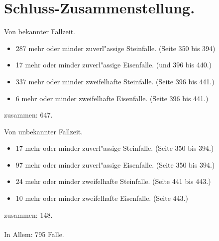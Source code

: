 \documentclass[a4paper, 8pt, oneside, polutonikogreek, german]{article}
\begin{document}
\section{Schluss-Zusammenstellung.}
\begin{center}
Von bekannter Fallzeit.
\end{center}
\begin{itemize}
    \item 287 mehr oder minder zuverl"assige Steinfalle. (Seite 350 bis 394)
    \item 17 mehr oder minder zuverl"assige Eisenfalle. (und 396 bis 440.)
    \item 337 mehr oder minder zweifelhafte Steinfalle. (Seite 396 bis 441.)
    \item 6 mehr oder minder zweifelhafte Eisenfalle. (Seite 396 bis 441.)
\end{itemize}
\begin{center}
zusammen: 647.
\end{center}
\begin{center}
Von unbekannter Fallzeit.
\end{center}
\begin{itemize}
    \item 17 mehr oder minder zuverl"assige Steinfalle. (Seite 350 bis 394.)
    \item 97 mehr oder minder zuverl"assige Eisenfalle. (Seite 350 bis 394.)
    \item 24 mehr oder minder zweifelhafte Steinfalle. (Seite 441 bis 443.)
    \item 10 mehr oder minder zweifelhafte Eisenfalle. (Seite 443.)
\end{itemize}
\begin{center}
zusammen: 148.
\end{center}

\paragraph{}
In Allem: 795 Falle.
\end{document}
